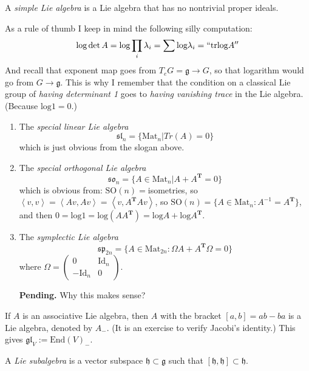\begin{definition}
\label{definition-simple-Lie-algebra}
A {\it simple Lie algebra} is a Lie algebra that has no nontrivial proper
ideals.
\end{definition}

As a rule of thumb I keep in mind the following silly computation:
$$
\text{log}\det A=\text{log} \prod_{i}\lambda_i=\sum \text{log}\lambda_i
=``\text{tr}\text{log}A''
$$
And recall that exponent map goes from $T_eG= \mathfrak{g} \to G$, so that
logarithm would go from $G\to \mathfrak{g}$. This is why I remember that the
condition on a classical Lie group of 
{\it having determinant 1} goes to {\it having vanishing trace} in the 
Lie algebra. (Because $\text{log}1=0$.)

\begin{example}
\label{example-Lie-algebras}
\begin{enumerate}
\item The {\it special linear Lie algebra} 
$$
\mathfrak{sl}_n=\{\text{Mat}_n|Tr(A)=0\}
$$
which is just obvious from the slogan above.
\item The {\it special orthogonal Lie algebra} 
$$
\mathfrak{so}_n=\{A\in \text{Mat}_n|A+A^{\mathbf{T}}=0\}
$$
which is obvious from: $\text{SO}(n)=$isometries, so
$\left<v,v\right>=\left<Av,Av\right>=\left<v,A^{\mathbf{T}}Av\right>$, so
$\text{SO}(n)=\{A \in \text{Mat}_n:A^{-1}=A^{\mathbf{T}}\}$, and then
$0=
\text{log}1=\text{log}(A A^{\mathbf{T}})=\text{log}A+\text{log}A^{\mathbf{T}}$.

\item The {\it symplectic Lie algebra}
$$
\mathfrak{sp}_{2n}=\{A \in \text{Mat}_{2n}:\Omega A+A^{\mathbf{T}}\Omega=0\}
$$
where $\Omega=\begin{pmatrix}
0&\text{Id}_n\\ 
-\text{Id}_n & 0
\end{pmatrix}$.

{\bf Pending.} Why this makes sense?
\end{enumerate}
\end{example}

\begin{example}
\label{example-associative-algebra-gives-Lie-algebra}
If $A$ is an associative Lie algebra, then $A$ with the bracket  $[a,b]=ab-ba$
is a Lie algebra, denoted by  $A_-$. (It is an exercise to verify Jacobi's
identity.) This gives  $\mathfrak{gl}_V:=\text{End}(V)_-$.
\end{example}

\begin{definition}
\label{definition-Lie-subalgebra}
A {\it Lie subalgebra} is a vector subspace $\mathfrak{h} \subset \mathfrak{g}$
such that $[\mathfrak{h},\mathfrak{h}] \subset \mathfrak{h}$.
\end{definition}

